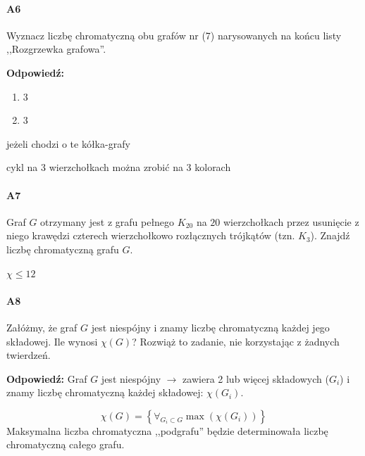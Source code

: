 \paragraph{A6} Wyznacz liczbę chromatyczną obu grafów nr (7) narysowanych na końcu listy ,,Rozgrzewka grafowa''.

\textbf{Odpowiedź:} 
\begin{enumerate}[label=\alph*)]
\item 3
\item 3
\end{enumerate}
jeżeli chodzi o te kółka-grafy

cykl na 3 wierzchołkach można zrobić na 3 kolorach



\paragraph{A7} Graf $G$ otrzymany jest z grafu pełnego $K_{20}$ na $20$ wierzchołkach przez usunięcie z niego krawędzi czterech wierzchołkowo rozłącznych trójkątów (tzn. $K_3$). Znajdź liczbę chromatyczną grafu $G$.

$\chi \leq 12$

\paragraph{A8} Załóżmy, że graf $G$ jest niespójny i znamy liczbę chromatyczną każdej jego składowej. Ile wynosi $\chi (G)$?
Rozwiąż to zadanie, nie korzystając z żadnych twierdzeń.

\textbf{Odpowiedź:} 
Graf $G$ jest niespójny $\rightarrow $ zawiera 2 lub więcej składowych ($G_i$) i znamy liczbę chromatyczną każdej składowej: $\chi (G_i)$.

$$\chi (G) = \left\{\forall _{G_i \subset G} \max (\chi (G_i)) \right\}$$
Maksymalna liczba chromatyczna ,,podgrafu'' będzie determinowała liczbę chromatyczną całego grafu.

